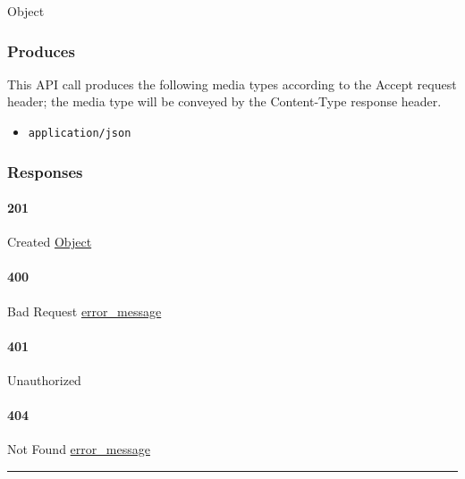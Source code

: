 Object

\hypertarget{produces-63}{%
\subsubsection{Produces}\label{produces-63}}

This API call produces the following media types according to the
{Accept} request header; the media type will be conveyed by the
{Content-Type} response header.

\begin{itemize}
\tightlist
\item
  \texttt{application/json}
\end{itemize}

\hypertarget{responses-63}{%
\subsubsection{Responses}\label{responses-63}}

\hypertarget{section-209}{%
\paragraph{201}\label{section-209}}

Created \protect\hyperlink{Object}{Object}

\hypertarget{section-210}{%
\paragraph{400}\label{section-210}}

Bad Request \protect\hyperlink{error_message}{error\_message}

\hypertarget{section-211}{%
\paragraph{401}\label{section-211}}

Unauthorized \protect\hyperlink{}{}

\hypertarget{section-212}{%
\paragraph{404}\label{section-212}}

Not Found \protect\hyperlink{error_message}{error\_message}

\begin{center}\rule{0.5\linewidth}{\linethickness}\end{center}

